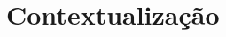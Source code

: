 \documentclass{atividadeUtfpr}
\begin{document}
\cabecalhoAtividade

\section{Contextualização}
\end{document}
